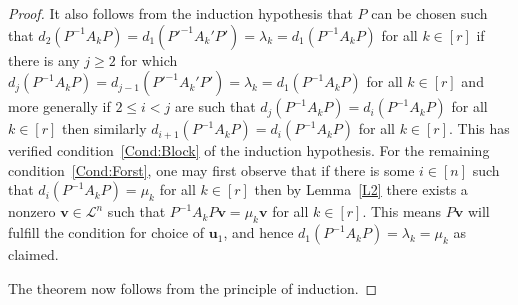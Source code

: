 \documentclass[12pt]{article}
\newcommand{\mc}{\mathcal}
\newcommand{\vek}{\mathbf}
\begin{document}
\begin{proof}
  It also follows from the induction hypothesis that $P$ can be chosen 
  such that \(d_2(P^{-1} A_k P) = d_1(P'^{-1} A_k' P') = \lambda_k = 
  d_1(P^{-1} A_k P)\) for all \(k \in [r]\) if there is any \(j 
  \geqslant 2\) for which \(d_j(P^{-1} A_k P) = d_{j-1}(P'^{-1} A_k' 
  P') = \lambda_k = d_1(P^{-1} A_k P)\) for all \(k \in [r]\) and 
  more generally if \(2 \leqslant i < j\) are such that 
  \(d_j(P^{-1} A_k P) = d_i(P^{-1} A_k P)\) for all \(k \in [r]\) 
  then similarly \(d_{i+1}(P^{-1} A_k P) = d_i(P^{-1} A_k P)\) 
  for all \(k \in [r]\). This has verified 
  condition~\ref{Cond:Block} of the induction hypothesis. 
  For the remaining condition~\ref{Cond:Forst}, one may first observe 
  that if there is some \(i \in [n]\) such that \(d_i(P^{-1} A_k P) = 
  \mu_k\) for all \(k \in [r]\) then by Lemma~\ref{L2} 
  there exists a nonzero \(\vek{v} \in \mc{L}^n\) such that 
  \(P^{-1} A_k P \vek{v} = \mu_k \vek{v}\) for all \(k \in [r]\). This 
  means $P \vek{v}$ will fulfill the condition for choice of 
  $\vek{u}_1$, and hence \(d_1(P^{-1} A_k P) = \lambda_k = \mu_k\) as 
  claimed.
  
  The theorem now follows from the principle of induction.
\end{proof}
\end{document}
